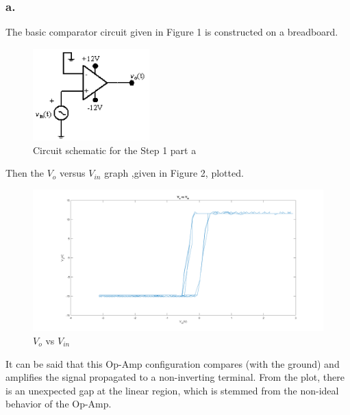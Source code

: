 \documentclass[letterpaper,12pt]{article}
\begin{document}
\subsubsection{a.}
The basic comparator circuit given in Figure 1 is constructed on a breadboard.
\begin{figure}[H]
	\centering
   \includegraphics[width=0.4\textwidth]{circuit1.png}
   \caption{Circuit schematic for the Step 1 part a}
\end{figure} 
Then the \(V_{o} \) versus \( V_{in}\) graph ,given in Figure 2, plotted.
\begin{figure}[H]
	\centering
   \includegraphics[width=1\textwidth]{e_1_a.png}
   \caption{\(V_{o} \) vs \( V_{in}\)}
\end{figure} 
It can be said that this Op-Amp configuration compares (with the ground) and amplifies the signal propagated to a non-inverting terminal. From the plot, there is an unexpected gap at the linear region, which is stemmed from the non-ideal behavior of the Op-Amp. 
\end{document}
